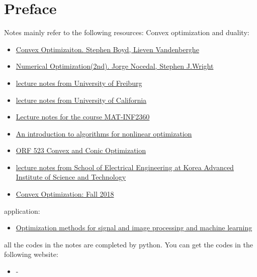 \chapter*{Preface}


Notes mainly refer to the following resources:
Convex optimization and duality:
\begin{itemize}
    \item \href{https://web.stanford.edu/~boyd/cvxbook/}{Convex Optimizaiton. Stephen Boyd, Lieven Vandenberghe}
    \item \href{https://link.springer.com/book/10.1007/978-0-387-40065-5}{Numerical Optimization(2nd). Jorge Nocedal, Stephen J.Wright} 
    \item \href{https://cdn.syscop.de/publications/Diehl2016.pdf}{lecture notes from University of Freiburg}
    \item \href{https://faculty.ucmerced.edu/mcarreira-perpinan/teaching/EECS260/lecture-notes.pdf}{lecture notes from University of California}
    \item \href{https://www.uio.no/studier/emner/matnat/math/nedlagte-emner/MAT-INF2360/v13/matinf2360part3.pdf}{Lecture notes for the course MAT-INF2360}
    \item \href{https://www.numerical.rl.ac.uk/people/nimg/msc/lectures/paper.pdf}{An introduction to algorithms for nonlinear optimization} 
    \item \href{https://www.princeton.edu/~aaa/Public/Teaching/ORF523/S16/}{ORF 523 Convex and Conic Optimization}
    \item \href{}{lecture notes from School of Electrical Engineering at Korea Advanced Institute of Science and Technology}
    \item \href{https://www.stat.cmu.edu/~ryantibs/convexopt-F18/}{Convex Optimization: Fall 2018}
\end{itemize}


application:

\begin{itemize}
    \item \href{https://web.eecs.umich.edu/~fessler/course/598/}{Optimization methods for signal and image processing and machine learning}
\end{itemize}




all the codes in the notes are completed by python. You can get the codes in the following website:
\begin{itemize}
    \item -
\end{itemize}

